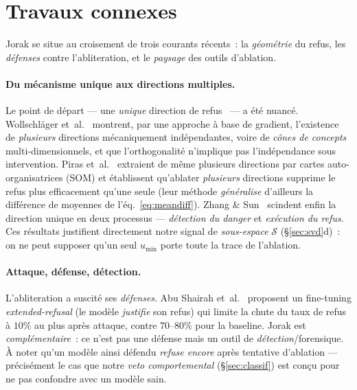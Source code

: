 \documentclass[11pt,a4paper]{article}
\theoremstyle{definition}
\theoremstyle{plain}
\begin{document}
\section{Travaux connexes}\label{sec:related}
Jorak se situe au croisement de trois courants récents~: la \emph{géométrie} du refus,
les \emph{défenses} contre l'abliteration, et le \emph{paysage} des outils d'ablation.

\paragraph{Du mécanisme unique aux directions multiples.}
Le point de départ — une \emph{unique} direction de refus~\cite{arditi2024} — a été
nuancé. Wollschläger et~al.~\cite{wollschlager2025} montrent, par une approche à base
de gradient, l'existence de \emph{plusieurs} directions mécaniquement indépendantes,
voire de \emph{cônes de concepts} multi-dimensionnels, et que l'orthogonalité
n'implique pas l'indépendance sous intervention. Piras et~al.~\cite{piras2025}
extraient de même plusieurs directions par cartes auto-organisatrices (SOM) et
établissent qu'ablater \emph{plusieurs} directions supprime le refus plus efficacement
qu'une seule (leur méthode \emph{généralise} d'ailleurs la différence de moyennes de
l'éq.~\eqref{eq:meandiff}). Zhang \& Sun~\cite{zhang2025dbdi} scindent enfin la
direction unique en deux processus — \emph{détection du danger} et \emph{exécution du
refus}. Ces résultats justifient directement notre signal de \emph{sous-espace}
$\mathcal{S}$ (\S\ref{sec:svd}d)~: on ne peut supposer qu'un seul $u_{\min}$ porte toute
la trace de l'ablation.

\paragraph{Attaque, défense, détection.}
L'abliteration a suscité ses \emph{défenses}. Abu Shairah et~al.~\cite{abushairah2025}
proposent un fine-tuning \emph{extended-refusal} (le modèle \emph{justifie} son refus)
qui limite la chute du taux de refus à $10\%$ au plus après attaque, contre
$70$--$80\%$ pour la baseline. Jorak est \emph{complémentaire}~: ce n'est pas une
défense mais un outil de \emph{détection}/forensique. À noter qu'un modèle ainsi
défendu \emph{refuse encore} après tentative d'ablation — précisément le cas que notre
\emph{veto comportemental} (\S\ref{sec:classif}) est conçu pour ne pas confondre avec
un modèle sain.
\end{document}
